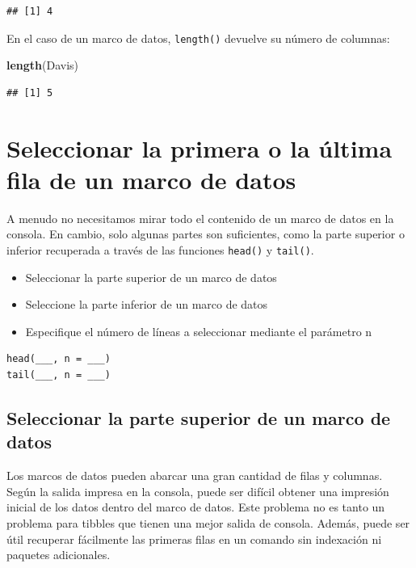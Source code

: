 \documentclass[
]{book}
\newenvironment{Shaded}{\begin{snugshade}}{\end{snugshade}}
\newcommand{\KeywordTok}[1]{\textcolor[rgb]{0.13,0.29,0.53}{\textbf{#1}}}
\newcommand{\NormalTok}[1]{#1}
\providecommand{\tightlist}{%
  \setlength{\itemsep}{0pt}\setlength{\parskip}{0pt}}
\begin{document}
\begin{verbatim}
## [1] 4
\end{verbatim}

En el caso de un marco de datos, \texttt{length()} devuelve su número de columnas:

\begin{Shaded}
\begin{Highlighting}[]
\KeywordTok{length}\NormalTok{(Davis)}
\end{Highlighting}
\end{Shaded}

\begin{verbatim}
## [1] 5
\end{verbatim}

\hypertarget{seleccionar-la-primera-o-la-uxfaltima-fila-de-un-marco-de-datos}{%
\section{Seleccionar la primera o la última fila de un marco de datos}\label{seleccionar-la-primera-o-la-uxfaltima-fila-de-un-marco-de-datos}}

A menudo no necesitamos mirar todo el contenido de un marco de datos en la consola. En cambio, solo algunas partes son suficientes, como la parte superior o inferior recuperada a través de las funciones \texttt{head()} y \texttt{tail()}.

\begin{itemize}
\tightlist
\item
  Seleccionar la parte superior de un marco de datos
\item
  Seleccione la parte inferior de un marco de datos
\item
  Especifique el número de líneas a seleccionar mediante el parámetro n
\end{itemize}

\begin{verbatim}
head(___, n = ___)
tail(___, n = ___)
\end{verbatim}

\hypertarget{seleccionar-la-parte-superior-de-un-marco-de-datos}{%
\subsection{Seleccionar la parte superior de un marco de datos}\label{seleccionar-la-parte-superior-de-un-marco-de-datos}}

Los marcos de datos pueden abarcar una gran cantidad de filas y columnas. Según la salida impresa en la consola, puede ser difícil obtener una impresión inicial de los datos dentro del marco de datos. Este problema no es tanto un problema para tibbles que tienen una mejor salida de consola. Además, puede ser útil recuperar fácilmente las primeras filas en un comando sin indexación ni paquetes adicionales.
\end{document}
